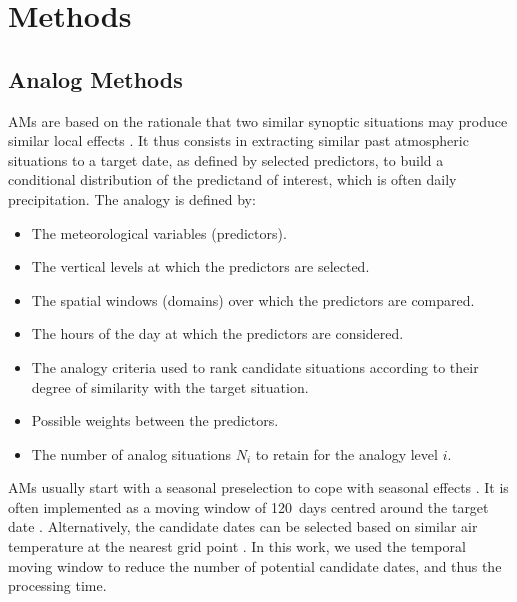 \documentclass[draft]{agujournal2019}
\begin{document}
\section{Methods}
\label{methods}

\subsection{Analog Methods}
\label{ams}

AMs are based on the rationale that two similar synoptic situations may produce similar local effects \cite{Lorenz1956, Lorenz1969}. It thus consists in extracting similar past atmospheric situations to a target date, as defined by selected predictors, to build a conditional distribution of the predictand of interest, which is often daily precipitation. The analogy is defined by:

\begin{itemize}		
	\item The meteorological variables (predictors).
	\item The vertical levels at which the predictors are selected.
	\item The spatial windows (domains) over which the predictors are compared.
	\item The hours of the day at which the predictors are considered.
	\item The analogy criteria used to rank candidate situations according to their degree of similarity with the target situation.
	\item Possible weights between the predictors.
	\item The number of analog situations $N_{i}$ to retain for the analogy level $i$.
\end{itemize}

AMs usually start with a seasonal preselection to cope with seasonal effects \cite{Lorenz1969}. It is often implemented as a moving window of 120~days centred around the target date \cite{Bontron2004, Marty2012, Horton2012, BenDaoud2016}. Alternatively, the candidate dates can be selected based on similar air temperature at the nearest grid point \cite{BenDaoud2016}. In this work, we used the temporal moving window to reduce the number of potential candidate dates, and thus the processing time.
\end{document}
